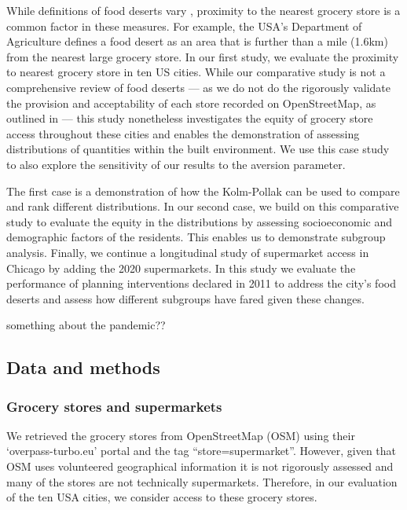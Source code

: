\documentclass[final,3p,times,onecolumn,sort&compress]{elsarticle}
\begin{document}
While definitions of food deserts vary \citep{Walker2010-ch}, proximity to the nearest grocery store is a common factor in these measures. 
For example, the USA’s Department of Agriculture defines a food desert as an area that is further than a mile (1.6km) from the nearest large grocery store. 
In our first study, we evaluate the proximity to nearest grocery store in ten US cities. 
While our comparative study is not a comprehensive review of food deserts --- as we do not do the rigorously validate the provision and acceptability of each store recorded on OpenStreetMap, as outlined in \cite{Kolak2018-az} --- this study nonetheless investigates the equity of grocery store access throughout these cities and enables the demonstration of assessing distributions of quantities within the built environment. 
We use this case study to also explore the sensitivity of our results to the aversion parameter.

The first case is a demonstration of how the Kolm-Pollak can be used to compare and rank different distributions.
In our second case, we build on this comparative study to evaluate the equity in the distributions by assessing socioeconomic and demographic factors of the residents.
This enables us to demonstrate subgroup analysis.
Finally, we continue a longitudinal study of supermarket access in Chicago by adding the 2020 supermarkets.
In this study we evaluate the performance of planning interventions declared in 2011 to address the city's food deserts and assess how different subgroups have fared given these changes.

something about the pandemic??

\subsection{Data and methods}
\subsubsection{Grocery stores and supermarkets}
We retrieved the grocery stores from OpenStreetMap (OSM) using their `overpass-turbo.eu' portal and the tag ``store=supermarket''.
However, given that OSM uses volunteered geographical information it is not rigorously assessed and many of the stores are not technically supermarkets.
Therefore, in our evaluation of the ten USA cities, we consider access to these grocery stores.
\end{document}
